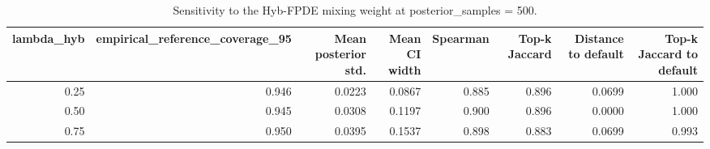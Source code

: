 \begin{table}[t]
\centering
\caption{Sensitivity to the Hyb-FPDE mixing weight at posterior\_samples = 500.}
\label{tab:lambda_sensitivity}
\begin{tabular}{r r r r r r r r}
        \hline
        lambda\_hyb & empirical\_reference\_coverage\_95 & Mean posterior std. & Mean CI width & Spearman & Top-k Jaccard & Distance to default & Top-k Jaccard to default \\
        \hline
        0.25 & 0.946 & 0.0223 & 0.0867 & 0.885 & 0.896 & 0.0699 & 1.000 \\
        0.50 & 0.945 & 0.0308 & 0.1197 & 0.900 & 0.896 & 0.0000 & 1.000 \\
        0.75 & 0.950 & 0.0395 & 0.1537 & 0.898 & 0.883 & 0.0699 & 0.993 \\
        \hline
\end{tabular}
\end{table}
